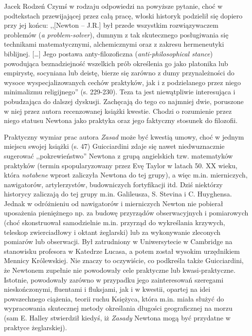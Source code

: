 \begin{recplenv}{Jacek Rodzeń}
Czymś w rodzaju odpowiedzi na powyższe pytanie, choć w podtekstach przewijającej przez całą pracę, włoski historyk
podzielił się dopiero przy jej końcu: ,,[Newton -- J.R.] był przede wszystkim rozwiązywaczem problemów (\textit{a
problem-solver}), dumnym z tak skutecznego posługiwania się technikami matematycznymi, alchemicznymi oraz z zakresu
hermeneutyki biblijnej. […] Jego postawa anty-filozoficzna (\textit{anti-philosophical stance}) powodująca
beznadziejność wszelkich prób określenia go jako platonika lub empirystę, socyniana lub deistę, bierze się zarówno z
dumy przynależności do wysoce wyspecjalizowanych cechów praktyków, jak i z podzielanego przez niego minimalizmu
religijnego'' (s. 229-230). Teza ta jest niewątpliwie interesująca i pobudzająca do dalszej dyskusji. Zachęcają do tego
co najmniej dwie, poruszone w niej przez autora recenzowanej książki kwestie. Chodzi o rozumienie przez niego statusu
Newtona jako praktyka oraz jego faktyczny stosunek do filozofii. 

Praktyczny wymiar prac autora \textit{Zasad} może być kwestią umowy, choć w jednym miejscu swojej książki (s. 47)
Guicciardini zdaje się nawet niedwuznacznie sugerować ,,pokrewieństwo'' Newtona z grupą angielskich tzw. matematyków
praktyków (termin spopularyzowany przez Evę Taylor w latach 50. XX wieku, która \textit{notabene} wprost zaliczyła
Newtona do tej grupy), a więc m.in. mierniczych, nawigatorów, artylerzystów, budowniczych fortyfikacji itd. Dziś
niektórzy historycy zaliczają do tej grupy m.in. Galileusza, S. Stevina i C. Huyghensa. Jednak w odróżnieniu od
nawigatorów i mierniczych Newton nie pobierał uposażenia pieniężnego np. za budowę przyrządów obserwacyjnych i
pomiarowych (choć skonstruował samodzielnie m.in. przyrząd do wykreślania krzywych, teleskop zwierciadłowy i oktant
żeglarski) lub za wykonywanie zleconych pomiarów lub obserwacji. Był zatrudniony w Uniwersytecie w Cambridge na
stanowisku profesora w Katedrze Lucasa, a potem został wysokim urzędnikiem Mennicy Królewskiej. Nie znaczy to
oczywiście, co podkreśla także Guicciardini, że Newtonem zupełnie nie powodowały cele praktyczne lub kwasi-praktyczne.
Istotnie, powodowały zarówno w przypadku jego zainteresowań szeregami nieskończonymi, fluentami i fluksjami, jak i w
kwestii, opartej na idei powszechnego ciążenia, teorii ruchu Księżyca, która m.in. miała służyć do wypracowania
skutecznej metody określania długości geograficznej na morzu (sam E. Halley stwierdził kiedyś, iż \textit{Zasady}
Newtona mogą być przydatne w praktyce żeglarskiej).


\end{recplenv}
